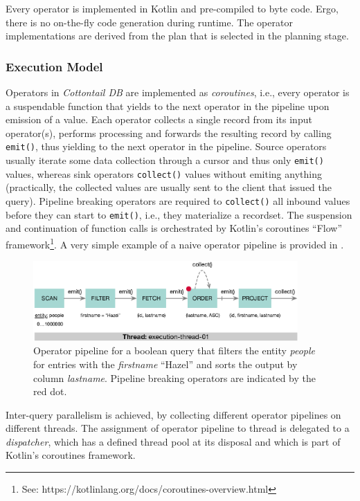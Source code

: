 Every operator is implemented in Kotlin and pre-compiled to byte code. Ergo, there is no on-the-fly code generation during runtime. The operator implementations are derived from the plan that is selected in the planning stage.

\subsubsection{Execution Model}

Operators in \emph{Cottontail DB} are implemented as \emph{coroutines}, i.e., every operator is a suspendable function that yields to the next operator in the pipeline upon emission of a value. Each operator collects a single record from its input operator(s), performs processing and forwards the resulting record by calling \texttt{emit()}, thus yielding to the next operator in the pipeline. Source operators usually iterate some data collection through a cursor and thus only \texttt{emit()} values, whereas sink operators \texttt{collect()} values without emiting anything (practically, the collected values are usually sent to the client that issued the query). Pipeline breaking operators are required to \texttt{collect()} all inbound values before they can start to \texttt{emit()}, i.e., they materialize a recordset. The suspension and continuation of function calls is orchestrated by Kotlin's coroutines ``Flow'' framework\footnote{See: https://kotlinlang.org/docs/coroutines-overview.html}. A very simple example of a naive operator pipeline is provided in .

\begin{figure}[bt]
    \centering
    \includegraphics[width=0.9\textwidth]{figures/execution-model-simple}
    \caption{Operator pipeline for a boolean query that filters the entity \emph{people} for entries with the \emph{firstname} ``Hazel'' and sorts the output by column \emph{lastname}. Pipeline breaking operators are indicated by the red dot.}
    \label{figure:cottontail_execution_model_simple}
\end{figure}

Inter-query parallelism is achieved, by collecting different operator pipelines on different threads. The assignment of operator pipeline to thread is delegated to a \emph{dispatcher}, which has a defined thread pool at its disposal and which is part of Kotlin's coroutines framework. 

